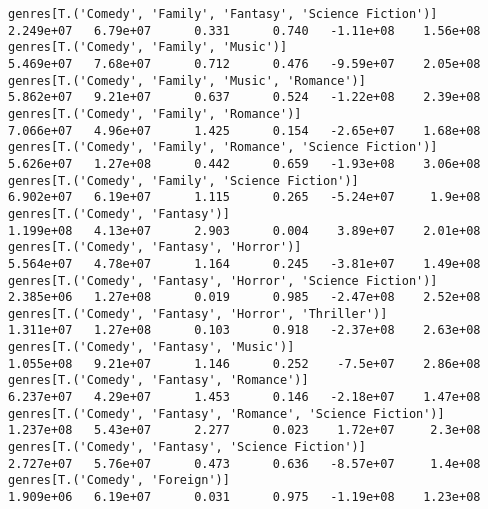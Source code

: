 \documentclass[11pt]{article}
\begin{document}
\begin{Verbatim}[commandchars=\\\{\}]
genres[T.('Comedy', 'Family', 'Fantasy', 'Science Fiction')]                                                  2.249e+07   6.79e+07      0.331      0.740   -1.11e+08    1.56e+08
genres[T.('Comedy', 'Family', 'Music')]                                                                       5.469e+07   7.68e+07      0.712      0.476   -9.59e+07    2.05e+08
genres[T.('Comedy', 'Family', 'Music', 'Romance')]                                                            5.862e+07   9.21e+07      0.637      0.524   -1.22e+08    2.39e+08
genres[T.('Comedy', 'Family', 'Romance')]                                                                     7.066e+07   4.96e+07      1.425      0.154   -2.65e+07    1.68e+08
genres[T.('Comedy', 'Family', 'Romance', 'Science Fiction')]                                                  5.626e+07   1.27e+08      0.442      0.659   -1.93e+08    3.06e+08
genres[T.('Comedy', 'Family', 'Science Fiction')]                                                             6.902e+07   6.19e+07      1.115      0.265   -5.24e+07     1.9e+08
genres[T.('Comedy', 'Fantasy')]                                                                               1.199e+08   4.13e+07      2.903      0.004    3.89e+07    2.01e+08
genres[T.('Comedy', 'Fantasy', 'Horror')]                                                                     5.564e+07   4.78e+07      1.164      0.245   -3.81e+07    1.49e+08
genres[T.('Comedy', 'Fantasy', 'Horror', 'Science Fiction')]                                                  2.385e+06   1.27e+08      0.019      0.985   -2.47e+08    2.52e+08
genres[T.('Comedy', 'Fantasy', 'Horror', 'Thriller')]                                                         1.311e+07   1.27e+08      0.103      0.918   -2.37e+08    2.63e+08
genres[T.('Comedy', 'Fantasy', 'Music')]                                                                      1.055e+08   9.21e+07      1.146      0.252    -7.5e+07    2.86e+08
genres[T.('Comedy', 'Fantasy', 'Romance')]                                                                    6.237e+07   4.29e+07      1.453      0.146   -2.18e+07    1.47e+08
genres[T.('Comedy', 'Fantasy', 'Romance', 'Science Fiction')]                                                 1.237e+08   5.43e+07      2.277      0.023    1.72e+07     2.3e+08
genres[T.('Comedy', 'Fantasy', 'Science Fiction')]                                                            2.727e+07   5.76e+07      0.473      0.636   -8.57e+07     1.4e+08
genres[T.('Comedy', 'Foreign')]                                                                               1.909e+06   6.19e+07      0.031      0.975   -1.19e+08    1.23e+08

\end{Verbatim}
\end{document}
